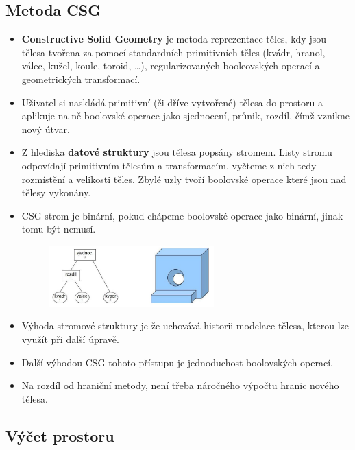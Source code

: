 \begin{itemize}
 \subsection{Metoda CSG}
 \begin{itemize}
 	\item \textbf{Constructive Solid Geometry} je metoda reprezentace těles, kdy jsou tělesa tvořena za pomocí standardních primitivních těles (kvádr, hranol, válec, kužel, koule, toroid, …), regularizovaných booleovských operací a geometrických transformací.
	\item Uživatel si naskládá primitivní (či dříve vytvořené) tělesa do prostoru a aplikuje na ně boolovské operace jako sjednocení, průnik, rozdíl, čímž vznikne nový útvar.
	\item Z hlediska \textbf{datové struktury} jsou tělesa popsány stromem. Listy stromu odpovídají primitivním tělesům a transformacím, vyčteme z nich tedy rozmístění a velikosti těles. Zbylé uzly tvoří boolovské operace které jsou nad tělesy vykonány.
	\item CSG strom je binární, pokud chápeme boolovské operace jako binární, jinak tomu být nemusí.
		\begin{figure}[H]
		\centering
		\includegraphics[width=0.6\textwidth]{assets/4_csg}
		\end{figure}
 	\item Výhoda stromové struktury je že uchovává historii modelace tělesa, kterou lze využít při další úpravě.
 	\item Další výhodou CSG tohoto přístupu je jednoduchost boolovských operací.
 	\item Na rozdíl od hraniční metody, není třeba náročného výpočtu hranic nového tělesa.
 \end{itemize}

 \subsection{Výčet prostoru}

\end{itemize}

